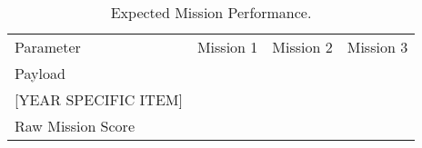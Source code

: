 \begin{table}[h!]
	\centering
	\caption{Expected Mission Performance.}
	\label{tab:expectedmissionperformance}
	\begin{tabular}{ C{1.5in}  C{1in}  C{1in}  C{1in}}
		
		Parameter & Mission 1 & Mission 2 & Mission 3 \\
		
		Payload & & &\\
		
		{\color{\BYUred} {\color{BYUred} [YEAR SPECIFIC ITEM]}} & & &\\
		
		Raw Mission Score & & &\\
		
	\end{tabular}
\end{table}
